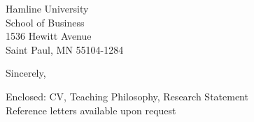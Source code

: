 \documentclass[11pt]{letter}\usepackage[]{graphicx}\usepackage[]{color}
\begin{document}
\begin{letter}{Hamline University\\
School of Business\\
1536 Hewitt Avenue\\
Saint Paul, MN 55104-1284
}
\addtolength{\medskipamount}{-1\medskipamount}
\closing{Sincerely,}


Enclosed: CV, Teaching Philosophy, Research Statement \\
Reference letters available upon request


\end{letter}
\end{document}
